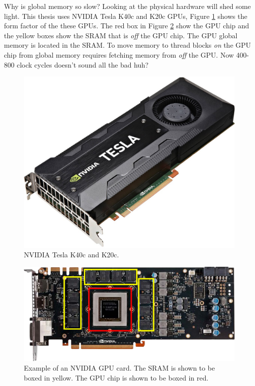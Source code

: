 Why is global memory so slow?
Looking at the physical hardware will shed some light.
This thesis uses NVIDIA Tesla K40c and K20c GPUs, Figure \ref{fig:GPUpicture} shows the form factor of the these GPUs.
The red box in Figure \ref{fig:GPUarch} show the GPU chip and the yellow boxes show the SRAM that is \textit{off} the GPU chip.
The GPU global memory is located in the SRAM.
To move memory to thread blocks \textit{on} the GPU chip from global memory requires fetching memory from \textit{off} the GPU.
Now 400-800 clock cycles doesn't sound all the bad huh?
\begin{figure}
	\centering\includegraphics[width=5in]{figures/gpu_intro/k40c_k20c.jpg}
	\caption{NVIDIA Tesla K40c and K20c.}
	\label{fig:GPUpicture}
\end{figure}
\begin{figure}
	\centering\includegraphics[width=\textwidth]{figures/gpu_intro/Kepler_box.png}
	\caption{Example of an NVIDIA GPU card. The SRAM is shown to be boxed in yellow. The GPU chip is shown to be boxed in red.}
	\label{fig:GPUarch}
\end{figure}

